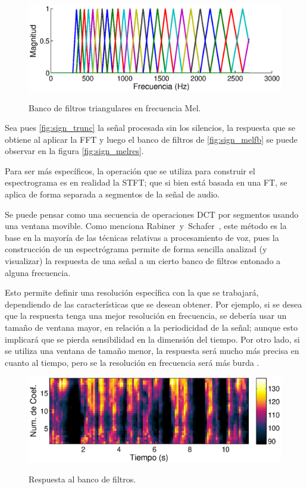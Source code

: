 \begin{figure}[t]
  \myfloatalign
  {\includegraphics[width=0.9\linewidth]{gfx/chap2/mfcc_filterbank}} \quad
  \caption{Banco de filtros triangulares en frecuencia Mel.}
  \label{fig:sign_melfb}
\end{figure}  

Sea pues \autoref{fig:sign_trunc} la señal procesada sin los silencios, la respuesta que se obtiene al aplicar la \ac{FFT} y luego el banco de filtros de \autoref{fig:sign_melfb} se puede observar en la figura \autoref{fig:sign_melres}.

Para ser más específicos, la operación que se utiliza para construir el espectrograma es en realidad la \ac{STFT}; que si bien está basada en una \ac{FT}, se aplica de forma separada a segmentos de la señal de audio. 

Se puede pensar como una secuencia de operaciones \ac{DCT} por segmentos usando una ventana movible. Como menciona Rabiner~y~Schafer~\cite{Rabiner2007}, este método es la base en la mayoría de las técnicas relativas a procesamiento de voz, pues la construcción de un espectrógrama permite de forma sencilla analizad (y visualizar) la respuesta de una señal a un cierto banco de filtros entonado a alguna frecuencia.

Esto permite definir una resolución específica con la que se trabajará, dependiendo de las características que se desean obtener. Por ejemplo, si se desea que la respuesta tenga una mejor resolución en frecuencia, se debería usar un tamaño de ventana mayor, en relación a la periodicidad de la señal; aunque esto implicará que se pierda sensibilidad en la dimensión del tiempo. Por otro lado, si se utiliza una ventana de tamaño menor, la respuesta será mucho más precisa en cuanto al tiempo, pero se la resolución en frecuencia será más burda \cite{Rabiner1993}.

\begin{figure}[t]
  \myfloatalign
  {\includegraphics[width=0.9\linewidth]{gfx/chap2/mfcc_result2}} \quad
  \caption{Respuesta al banco de filtros.}
  \label{fig:sign_melres}
\end{figure}

